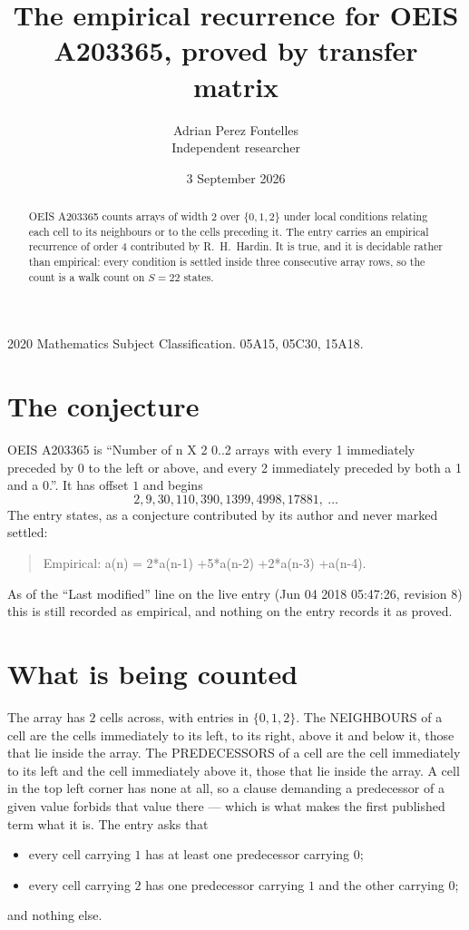 \documentclass[11pt,a4paper]{article}
\title{The empirical recurrence for OEIS A203365, proved by transfer matrix}
\author{Adrian Perez Fontelles\\ \small Independent researcher}
\date{3 September 2026}
\theoremstyle{plain}
\theoremstyle{definition}
\begin{document}
\maketitle

\begin{abstract}
OEIS A203365 counts arrays of width $2$ over $\{0,1,2\}$ under local conditions relating each cell
to its neighbours or to the cells preceding it. The entry carries an empirical recurrence of
order $4$ contributed by R.~H.~Hardin. It is true, and it is decidable rather than
empirical: every condition is settled inside three consecutive array rows, so the count is a
walk count on $S=22$ states.
\end{abstract}

\noindent\small 2020 Mathematics Subject Classification. 05A15, 05C30, 15A18.\normalsize

\section{The conjecture}

OEIS A203365 is ``Number of n X 2 0..2 arrays with every 1 immediately preceded by 0 to the left or above, and every 2 immediately preceded by both a 1 and a 0.''. It has offset $1$ and begins
\[
2, 9, 30, 110, 390, 1399, 4998, 17881,\ \dots
\]
The entry states, as a conjecture contributed by its author and never marked settled:
\begin{quote}
Empirical: a(n) = 2*a(n-1) +5*a(n-2) +2*a(n-3) +a(n-4).
\end{quote}
As of the ``Last modified'' line on the live entry (Jun 04 2018 05:47:26, revision 8) this is still
recorded as empirical, and nothing on the entry records it as proved.

\section{What is being counted}

The array has $2$ cells across, with entries in $\{0,1,2\}$. The NEIGHBOURS of a cell are the
cells immediately to its left, to its right, above it and below it, those that lie inside the
array. The PREDECESSORS of a cell are the cell immediately to its left and the cell
immediately above it, those that lie inside the array. A cell in the top left corner has none
at all, so a clause demanding a predecessor of a given value forbids that value there --- which
is what makes the first published term what it is. The entry asks that
\begin{itemize}
\item every cell carrying $1$ has at least one predecessor carrying $0$;
\item every cell carrying $2$ has one predecessor carrying $1$ and the other carrying $0$;
\end{itemize}
and nothing else.
\end{document}
